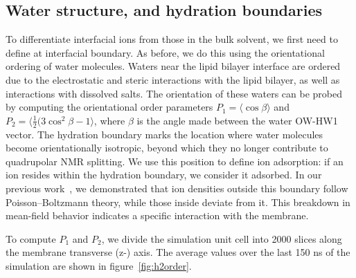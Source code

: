 \documentclass[12pt,openany,final]{book}
\begin{document}
\subsection{Water structure, and hydration boundaries}
To differentiate interfacial ions from those in the bulk solvent, we first need to define at interfacial boundary. As before\cite{saunders:2024}, we do this using the orientational ordering of water molecules. Waters near the lipid bilayer interface are ordered due to the electrostatic and steric interactions with the lipid bilayer, as well as interactions with dissolved salts. The
orientation of these waters can be probed by computing the orientational order parameters $P_1=\langle\cos{\beta}\rangle$ and $P_2=\langle{\frac{1}{2}(3\cos^{2}{\beta}-1}\rangle$, where $\beta$ is the angle made between the water OW-HW1 vector. The hydration boundary marks the location where water molecules become orientationally isotropic, beyond which they no longer contribute to quadrupolar NMR splitting. We use this position to define ion adsorption: if an ion resides within the hydration boundary, we consider it adsorbed. In our previous work~\cite{saunders:2024}, we demonstrated that ion densities outside this boundary follow Poisson–Boltzmann theory, while those inside deviate from it. This breakdown in mean-field behavior indicates a specific interaction with the membrane.

To compute $P_1$ and $P_2$, we divide the simulation unit cell into 2000 slices along the membrane transverse (z-) axis.
The average values over the last 150 ns of the simulation are shown in figure~\ref{fig:h2order}.
\end{document}
